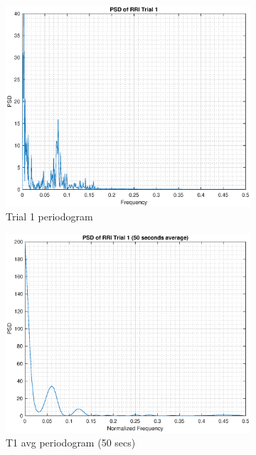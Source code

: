 \documentclass{article}
\begin{document}
\begin{figure}[h!]
\centering
\begin{subfigure}{0.32\textwidth}
\centering
\includegraphics[width = \textwidth]{rr_t1}
\caption{Trial 1 periodogram}
\label{fig:rr_t1}
\end{subfigure}
\begin{subfigure}{0.32\textwidth}
\centering
\includegraphics[width = \textwidth]{rr_t1_50}
\caption{T1 avg periodogram (50 secs)}
\label{fig:rr_t1_50}
\end{subfigure}
\begin{subfigure}{0.32\textwidth}

\end{subfigure}
\end{figure}
\end{document}
